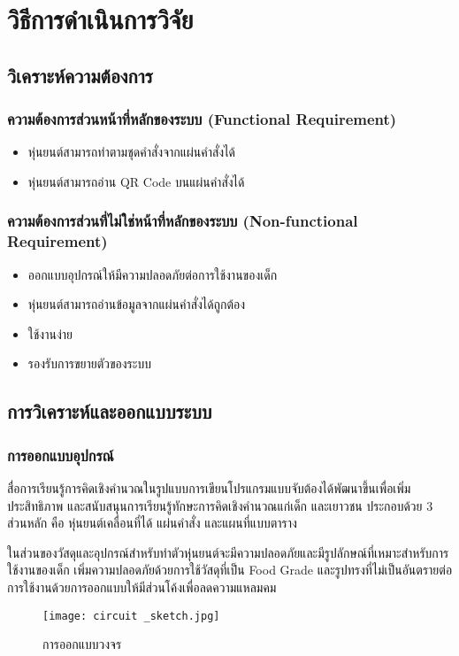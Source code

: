 \chapter{วิธีการดำเนินการวิจัย}
\label{chapter:experiment}

\section{วิเคราะห์ความต้องการ}
\subsection{ความต้องการส่วนหน้าที่หลักของระบบ (Functional Requirement)}
\begin{itemize}
    \itemsep0em
    \item หุ่นยนต์สามารถทำตามชุดคำสั่งจากแผ่นคำสั่งได้
    \item หุ่นยนต์สามารถอ่าน QR Code บนแผ่นคำสั่งได้
\end{itemize}

\subsection{ความต้องการส่วนที่ไม่ใช่หน้าที่หลักของระบบ (Non-functional Requirement)}
\begin{itemize}
    \itemsep0em
    \item ออกแบบอุปกรณ์ให้มีความปลอดภัยต่อการใช้งานของเด็ก
    \item หุ่นยนต์สามารถอ่านข้อมูลจากแผ่นคำสั่งได้ถูกต้อง
    \item ใช้งานง่าย
    \item รองรับการขยายตัวของระบบ
\end{itemize}

\section{การวิเคราะห์และออกแบบระบบ}
\subsection{การออกแบบอุปกรณ์}
สื่อการเรียนรู้การคิดเชิงคำนวณในรูปแบบการเขียนโปรแกรมแบบจับต้องได้พัฒนาขึ้นเพื่อเพิ่มประสิทธิภาพ และสนับสนุนการเรียนรู้ทักษะการคิดเชิงคำนวณแก่เด็ก และเยาวชน ประกอบด้วย 3 ส่วนหลัก คือ หุ่นยนต์เคลื่อนที่ได้ แผ่นคำสั่ง และแผนที่แบบตาราง 

ในส่วนของวัสดุและอุปกรณ์สำหรับทำตัวหุ่นยนต์จะมีความปลอดภัยและมีรูปลักษณ์ที่เหมาะสำหรับการใช้งานของเด็ก เพิ่มความปลอดภัยด้วยการใช้วัสดุที่เป็น Food Grade และรูปทรงที่ไม่เป็นอันตรายต่อการใช้งานด้วยการออกแบบให้มีส่วนโค้งเพื่อลดความแหลมคม
\begin{figure}[ht]
    \centering
    \texttt{[image: circuit \_sketch.jpg]}
    \caption{การออกแบบวงจร}
    \label{fig:circuit}
\end{figure}

